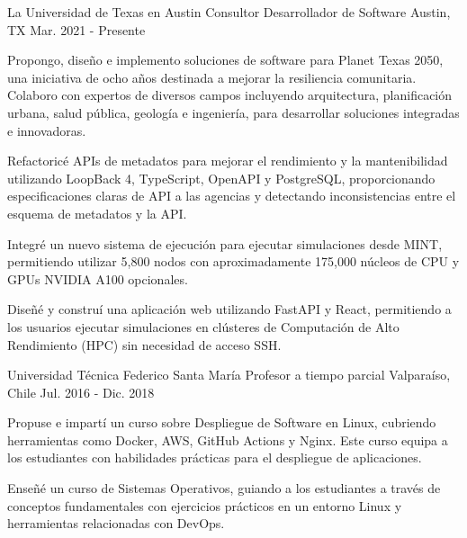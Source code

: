 \begin{cventries}
  \cventry
    {La Universidad de Texas en Austin}
    {Consultor Desarrollador de Software}
    {Austin, TX}
    {Mar. 2021 - Presente}
    {
      \begin{cvitems}
        \item{Propongo, diseño e implemento soluciones de software para Planet Texas 2050, una iniciativa de ocho años destinada a mejorar la resiliencia comunitaria. Colaboro con expertos de diversos campos incluyendo arquitectura, planificación urbana, salud pública, geología e ingeniería, para desarrollar soluciones integradas e innovadoras.}
        \item{Refactoricé APIs de metadatos para mejorar el rendimiento y la mantenibilidad utilizando LoopBack 4, TypeScript, OpenAPI y PostgreSQL, proporcionando especificaciones claras de API a las agencias y detectando inconsistencias entre el esquema de metadatos y la API.}
        \item{Integré un nuevo sistema de ejecución para ejecutar simulaciones desde MINT, permitiendo utilizar 5,800 nodos con aproximadamente 175,000 núcleos de CPU y GPUs NVIDIA A100 opcionales.}
        \item{Diseñé y construí una aplicación web utilizando FastAPI y React, permitiendo a los usuarios ejecutar simulaciones en clústeres de Computación de Alto Rendimiento (HPC) sin necesidad de acceso SSH.}
      \end{cvitems}
    }

  \cventry
    {Universidad Técnica Federico Santa María}
    {Profesor a tiempo parcial}
    {Valparaíso, Chile}
    {Jul. 2016 - Dic. 2018}
    {
      \begin{cvitems}
        \item{Propuse e impartí un curso sobre Despliegue de Software en Linux, cubriendo herramientas como Docker, AWS, GitHub Actions y Nginx. Este curso equipa a los estudiantes con habilidades prácticas para el despliegue de aplicaciones.}
        \item{Enseñé un curso de Sistemas Operativos, guiando a los estudiantes a través de conceptos fundamentales con ejercicios prácticos en un entorno Linux y herramientas relacionadas con DevOps.}
      \end{cvitems}
    }


\end{cventries}
